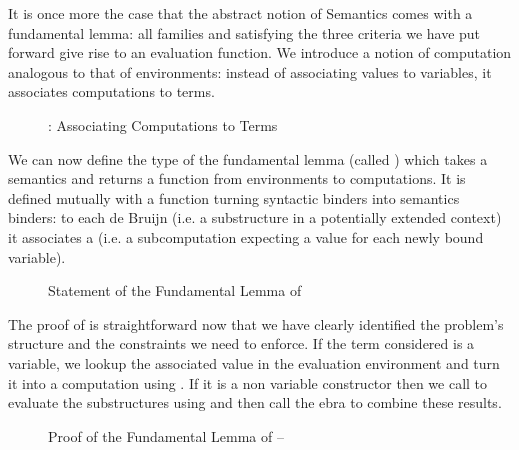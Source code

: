 {
\label{defn:Kripke}
}


It is once more the case that the abstract notion of Semantics comes with
a fundamental lemma: all   families  and 
satisfying the three criteria we have put forward give rise to an evaluation
function. We introduce a notion of computation  analogous to
that of environments: instead of associating values to variables, it
associates computations to terms.

\begin{figure}[h]
\caption{: Associating Computations to Terms}
\end{figure}

We can now define the type of the fundamental lemma (called ) which
takes a semantics and returns a function from environments to computations. It is
defined mutually with a function  turning syntactic binders into
semantics binders: to each de Bruijn  (i.e. a substructure in a potentially
extended context) it associates a  (i.e. a subcomputation expecting a
value for each newly bound variable).

\begin{figure}[h]
\caption{Statement of the Fundamental Lemma of \label{defn:semantics}}
\end{figure}

The proof of  is straightforward now that we have clearly identified the
problem's structure and the constraints we need to enforce. If the term considered
is a variable, we lookup the associated value in the evaluation environment and
turn it into a computation using . If it is a non variable constructor
then we call  to evaluate the substructures using  and then
call the ebra to combine these results.

\begin{figure}[h]
\caption{Proof of the Fundamental Lemma of  -- }
\end{figure}

